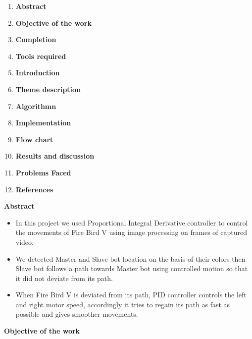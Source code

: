 \documentclass[report]{res}
\begin{document}
	\begin{enumerate}
		
		\item \textbf{\Large Abstract}
		\item \textbf{\Large Objective of the work}
		\item \textbf{\Large Completion}
		\item \textbf{\Large Tools required}
		\item \textbf{\Large Introduction}
		\item \textbf{\Large Theme description}
		\item \textbf{\Large Algorithmn}
		\item \textbf{\Large Implementation}
		\item \textbf{\Large Flow chart}
		\item \textbf{\Large Results and discussion}
		\item \textbf{\Large Problems Faced}
		\item \textbf{\Large References}
		
	\end{enumerate}
	
	\pagebreak
	
	
	\begin{center}
		\textbf{\huge Abstract} \\
	\end{center}
	
	\begin{itemize}
		
		\item In this project we used Proportional Integral Derivative controller to control the movements of Fire Bird V using image processing on frames of captured video. 
		\item We detected Master and Slave bot location on the basis of their colors then Slave bot follows a path towards Master bot using controlled motion so that it did not deviate from its path.
		\item When Fire Bird V is deviated from its path, PID controller controls the left and right motor speed, accordingly it tries to regain its path as fast as possible and gives smoother movements.
		
	\end{itemize}
	
	\pagebreak
	
	
	\begin{center}
		\textbf{\huge Objective of the work} \\
	\end{center}
	
\end{document}
